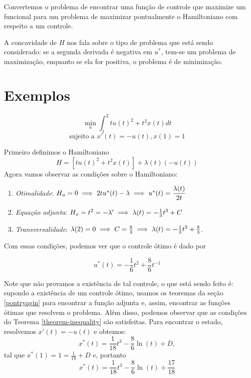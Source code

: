 \begin{remark}
    Convertemos o problema de encontrar uma função de controle que maximize um
    funcional para um problema de maximizar pontualmente o Hamiltoniano com
    respeito a um controle. 
\end{remark}

\begin{remark}
    A concavidade de $H$ nos fala sobre o tipo de problema que está sendo
    considerado: se a segunda derivada é negativa em $u^*$, tem-se um problema de
    maximização, enquanto se ela for positiva, o problema é de minimização. 
\end{remark}

\section{Exemplos}

\begin{example}
    \begin{equation*}
        \min_u \int_1^2 tu(t)^2 + t^2x(t) dt
    \end{equation*}
    \begin{equation*}
        \text{sujeito a } x'(t) = -u(t), x(1) = 1
    \end{equation*}
\end{example}

Primeiro definimos o Hamiltoniano 
$$
H = [tu(t)^2 + t^2 x(t)] + \lambda(t)(- u(t))
$$
Agora vamos observar as condições sobre o Hamiltoniano:

\begin{enumerate}
    \item \textit{Otimalidade}: $H_u = 0 \implies 2tu^*(t) - \lambda \implies
    u^*(t) = \dfrac{\lambda(t)}{2t}$
    \item \textit{Equação adjunta}: $H_x = t^2 = - \lambda ' \implies \lambda(t) = -
    \frac{1}{3}t^3 + C$
    \item \textit{Transversalidade}: $\lambda(2) = 0 \implies C = \frac{8}{3}
    \implies \lambda(t) = - \frac{1}{3}t^3 + \frac{8}{3}$.
\end{enumerate}

Com essas condições, podemos ver que o controle ótimo é dado por 

$$
u^*(t) = -\frac{1}{6}t^2 + \frac{8}{6}t^{-1}
$$

Note que não provamos a existência de tal controle, o que está sendo feito é:
supondo a existência de um controle ótimo, usamos os teoremas da seção
\ref{pontryagin} para encontrar a função adjunta e, assim, encontrar as
funções ótimas que resolvem o problema. Além disso, podemos observar que as
condições do Teorema \ref{theorem-inequality} são satisfeitas. Para encontrar o estado, resolvemos $x'(t) = - u(t)$ e obtemos:
$$
x^*(t) = \frac{1}{18}t^3 - \frac{8}{6}\ln(t) + D,
$$
tal que $x^*(1) = 1 = \frac{1}{18} + D$ e, portanto 
$$
x^*(t) = \frac{1}{18}t^3 - \frac{8}{6}\ln(t) + \frac{17}{18}
$$

